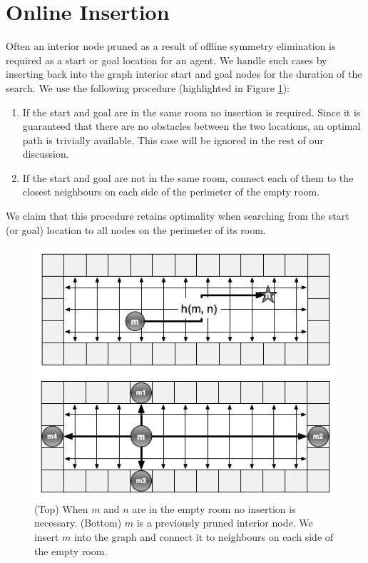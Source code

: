 \section{Online Insertion}
Often an interior node pruned as a result of offline symmetry elimination
is required as a start or goal location for an agent.
We handle such cases by inserting back into the graph interior start and goal nodes  
for the duration of the search.
We use the following procedure (highlighted in Figure \ref{fig:insertion}):
\begin{enumerate}
\item{If the start and goal are in the same room no insertion is required.
 Since it is guaranteed that there are no obstacles between the two locations, an optimal 
 path is trivially available. This case will be ignored in the rest of our discussion.}
\item{If the start and goal are not in the same room, connect each of them
to the closest neighbours on each side of the perimeter of the empty room.}
\end{enumerate}
We claim that this procedure retains optimality when searching from the start (or goal) location
to all nodes on the perimeter of its room.

\begin{figure}[t]
	\vspace{-4pt}
       \begin{center}
           \includegraphics[scale=0.50, trim = 10mm 10mm 10mm 0mm]{diagrams/roomtraversal.png}
       \end{center}
	\vspace{-3pt}
       \caption{(Top) When $m$ and $n$ are in the empty room no insertion is necessary.
				(Bottom) $m$ is a previously pruned interior node.
				We insert $m$ into the graph and connect it to neighbours on each side of the empty room.}
	\label{fig:insertion}
\end{figure}


